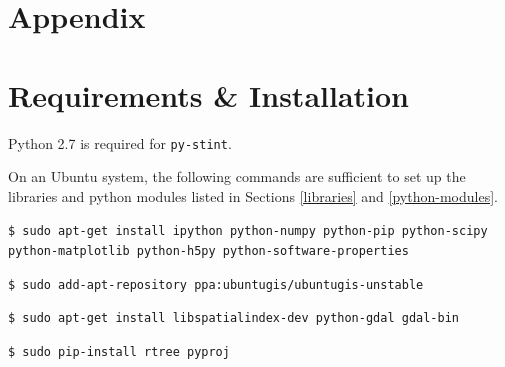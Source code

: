 \documentclass[twoside,a4paper]{refart}
\begin{document}
\clearpage
\section*{Appendix}
\appendix
\section{Requirements \& Installation}
\label{setup}

Python 2.7 is required for \texttt{py-stint}.

On an Ubuntu system, the following commands are sufficient to set up the libraries and python modules listed in Sections \ref{libraries} and \ref{python-modules}.

\texttt{\$ sudo apt-get install ipython python-numpy python-pip python-scipy python-matplotlib python-h5py python-software-properties}

\texttt{\$ sudo add-apt-repository ppa:ubuntugis/ubuntugis-unstable}

\texttt{\$ sudo apt-get install libspatialindex-dev python-gdal gdal-bin}

\texttt{\$ sudo pip-install rtree pyproj}
\end{document}
